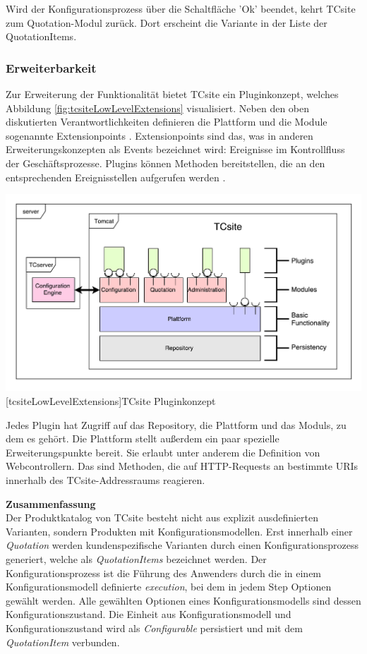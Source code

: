 \documentclass[11pt, a4paper, titlepage, listof=totoc, bibliography=totoc, index=totoc, twoside, openright, headings=normal]{scrreprt}
\begin{document}
Wird der Konfigurationsprozess über die Schaltfläche 'Ok' beendet, kehrt TCsite zum Quotation-Modul zurück. Dort erscheint die Variante in der Liste der QuotationItems.

\subsubsection{Erweiterbarkeit}
\label{subsubsection:Erweiterbarkeit}

Zur Erweiterung der Funktionalität bietet TCsite ein Pluginkonzept, welches Abbildung \ref{fig:tcsiteLowLevelExtensions} visualisiert. Neben den oben diskutierten Verantwortlichkeiten definieren die Plattform und die Module sogenannte Extensionpoints \citep{tactonTCsiteApiDocu}. Extensionpoints sind das, was in anderen Erweiterungskonzepten als Events bezeichnet wird: Ereignisse im Kontrollfluss der Geschäftsprozesse. Plugins können Methoden bereitstellen, die an den entsprechenden Ereignisstellen aufgerufen werden  \citep{tactonTCsiteDevelopmentManual}.

\vspace{1em}
\begin{minipage}{\linewidth}
	\centering
	\includegraphics[width=0.8\linewidth]{Abbildungen/tcsiteLowLevelExtensions.pdf}
	[tcsiteLowLevelExtensions]{TCsite Pluginkonzept}
	\label{fig:tcsiteLowLevelExtensions}
\end{minipage}
\vspace{1em}

Jedes Plugin hat Zugriff auf das Repository, die Plattform und das Moduls, zu dem es gehört. Die Plattform stellt außerdem ein paar spezielle Erweiterungspunkte bereit. Sie erlaubt unter anderem die Definition von Webcontrollern. Das sind Methoden, die auf HTTP-Requests an bestimmte URIs innerhalb des TCsite-Addressraums reagieren.

\textbf{Zusammenfassung}\\
Der Produktkatalog von TCsite besteht nicht aus explizit ausdefinierten Varianten, sondern Produkten mit Konfigurationsmodellen. Erst innerhalb einer \emph{Quotation} werden kundenspezifische Varianten durch einen Konfigurationsprozess generiert, welche als \emph{QuotationItems} bezeichnet werden. Der Konfigurationsprozess ist die Führung des Anwenders durch die in einem Konfigurationsmodell definierte \emph{execution}, bei dem in jedem Step Optionen gewählt werden. Alle gewählten Optionen eines Konfigurationsmodells sind dessen Konfigurationszustand. Die Einheit aus Konfigurationsmodell und Konfigurationszustand wird als \emph{Configurable} persistiert und mit dem \emph{QuotationItem} verbunden.
\end{document}
